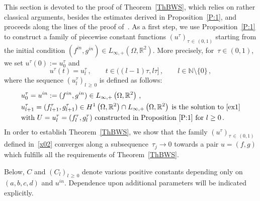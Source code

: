 \documentclass[10pt]{amsart}
\theoremstyle{definition}\newtheorem{defi}[theo]{Definition}\newtheorem{rema}[theo]{Remark}\newtheorem{exam}[theo]{Example}\newtheorem{exem}[theo]{Example}\newtheorem{nota}[theo]{Notation}
\newcommand{\bbR}{\mathbb{R}}
\newcommand{\bbN}{\mathbb{N}}
\begin{document}
This section is devoted to the proof of Theorem~\ref{ThBWS}, which relies on rather classical arguments, besides the estimates derived in Proposition~\ref{P:1}, and proceeds along the lines of the proof of~\cite[Theorem~1.2]{LM22}. As a first step, we use Proposition~\ref{P:1} to construct a family of piecewise constant functions $(u^\tau)_{\tau\,\in\,(0,1)}$ starting from the initial condition $(f^{in},g^{in})\in L_{\infty,+}(\Omega,\bbR^2)$. More precisely, for~${\tau\in (0,1)}$, we set $u^\tau(0):=u_0^\tau $ and
\begin{equation}\label{x01}
u^\tau(t)= u^\tau_{l}\,, \qquad t\in ((l-1)\tau, l\tau]\,, \qquad l\in\bbN\setminus\{0\}\,,
\end{equation}
where the sequence $(u_{l}^\tau)_{l\,\geq\,0}$ is defined as follows:
\begin{equation}
\begin{split}
&u_0^\tau = u^{in} := (f^{in},g^{in})\in L_{\infty,+}\left(\Omega,\bbR^2\right)\,, \\
&u_{l+1}^\tau =(f_{l+1}^\tau,g_{l+1}^\tau)\in H^1\left(\Omega,\bbR^2\right)\cap L_{\infty,+}\left(\Omega,\bbR^2\right) \;\text{is the solution to~\eqref{ex1}} \\
&\text{with } U=u_l^\tau=(f_l^\tau,g_l^\tau) \text{ constructed in Proposition~\ref{P:1} for }l\ge 0\,.
\end{split}\label{x02}
\end{equation}
In order to establish Theorem~\ref{ThBWS}, we show that the family $(u^\tau)_{\tau\,\in\,(0,1)}$ defined in~\eqref{x02} converges along a subsequence~${\tau_j\to0}$ towards a pair $u=(f,g)$ which fulfills all the requirements of Theorem~\ref{ThBWS}.


Below, $C$ and $(C_l)_{l\,\ge\,0}$ denote various positive constants depending only on~${(a, b, c, d)}$ and $u^{in}$. Dependence upon additional parameters will be indicated explicitly.
\end{document}
